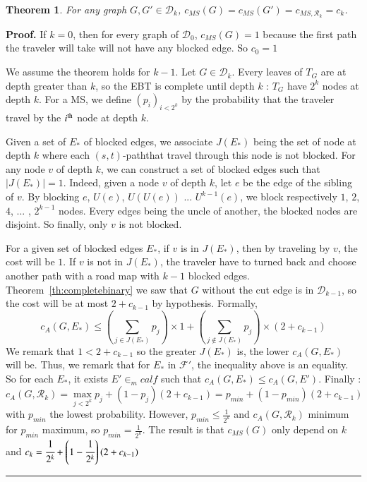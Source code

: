 \documentclass[preprint]{elsarticle}
\newtheorem{theorem}{Theorem}
\newenvironment{proof}[1][Proof]{\textbf{#1.} }{\ \rule{0.5em}{0.5em}}
\newcommand{\card}[1]{\left| #1 \right|}
\newcommand{\ith}[1]{#1^{\mbox{\scriptsize{th}}}}
\newcommand{\stpath}{$(s,t)$-path}
\newcommand{\mcalr}{\mathcal{R}}
\newcommand{\mcald}{\mathcal{D}}
\newcommand{\mcalf}{\mathcal{F}}
\newcommand{\mts}{MS}
\begin{document}
\begin{theorem}
For any graph $G, G' \in \mcald_k$, $c_{\mts}(G) = c_{\mts}(G') = c_{\mts, \mcalr_k} = c_k$.
\label{th:equalcompetitive}
\end{theorem}
\begin{proof}
If $k = 0$, then for every graph of $\mcald_0$, $c_{\mts}(G) = 1$ because the first path the traveler will take will not have any blocked edge. So $c_0 = 1$

We assume the theorem holds for $k-1$. Let $G \in \mcald_k$. Every leaves of $T_G$ are at depth greater than $k$, so the EBT is complete until depth $k$ : $T_G$ have $2^k$ nodes at depth $k$. For a \mts, we define $(p_i)_{i < 2^k}$ by the probability that the traveler travel by the $\ith{i}$ node at depth $k$.

Given a set of $E_*$ of blocked edges, we associate $J(E_*)$ being the set of node at depth $k$ where each \stpath that travel through this node is not blocked. For any node $v$ of depth $k$, we can construct a set of blocked edges such that $\card{J(E_*)} = 1$. Indeed, given a node $v$ of depth $k$, let $e$ be the edge of the sibling of $v$. By blocking $e$,  $U(e)$, $U(U(e))$ ... $U^{k-1}(e)$, we block respectively $1$, $2$, $4$, ... , $2^{k-1}$ nodes. Every edges being the uncle of another, the blocked nodes are disjoint. So finally, only $v$ is not blocked.

For a given set of blocked edges $E_*$, if $v$ is in $J(E_*)$, then by traveling by $v$, the cost will be $1$. If $v$ is not in $J(E_*)$, the traveler have to turned back and choose another path with a road map with $k-1$ blocked edges. Theorem~\ref{th:completebinary} we saw that $G$ without the cut edge is in $\mcald_{k-1}$, so the cost will be at most $2 + c_{k-1}$ by hypothesis. Formally,
\[
c_A(G, E_*) \leq \left(\sum_{j\in J(E_*)} p_j\right)\times 1 + \left(\sum_{j\notin J(E_*)}p_j\right)\times (2+c_{k-1})
\]
We remark that $1 < 2 + c_{k-1}$ so the greater $J(E_*)$ is, the lower $c_A(G, E_*)$ will be. Thus, we remark that for $E_*$ in $\mcalf'$, the inequality above is an equality. So for each $E_*$, it exists $E' \in _mcalf$ such that $c_A(G, E_*) \leq c_A(G, E')$. Finally :
\[
c_A(G, \mcalr_k) = \max_{j < 2^k} p_j + (1-p_j)(2+c_{k-1}) = p_{min} + (1-p_{min})(2+c_{k-1})
\]
with $p_{min}$ the lowest probability. However, $p_{min} \leq \frac{1}{2^k}$ and $c_A(G, \mcalr_k)$ minimum for $p_{min}$ maximum, so $p_{min} = \frac{1}{2^k}$. The result is that $c_{\mts}(G)$ only depend on $k$ and $c_k = \cfrac{1}{2^k} + \left(1-\cfrac{1}{2^k}\right)\left(2+c_{k-1}\right)$
\end{proof}
\end{document}

